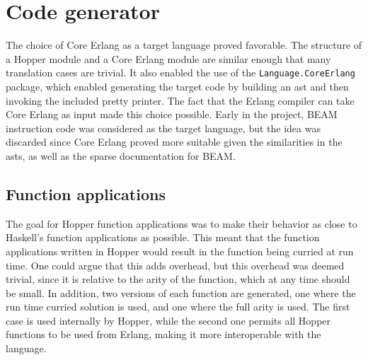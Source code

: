 \section{Code generator}

The choice of Core Erlang as a target language proved favorable. The structure of a Hopper module and a Core Erlang module are similar enough that many translation cases are trivial. It also enabled the use of the \texttt{Language.CoreErlang} \cite{CoreErlang} package, which enabled generating the target code by building an \gls{ast} and then invoking the included pretty printer. The fact that the Erlang compiler can take Core Erlang as input made this choice possible. Early in the project, BEAM instruction code was considered as the target language, but the idea was discarded since Core Erlang proved more suitable given the similarities in the \glspl{ast}, as well as the sparse documentation for BEAM.

\subsection{Function applications}

The goal for Hopper function applications was to make their behavior as close to Haskell's function applications as possible. This meant that the function applications written in Hopper would result in the function being curried at run time. One could argue that this adds overhead, but this overhead was deemed trivial, since it is relative to the \gls{arity} of the function, which at any time should be small. In addition, two versions of each function are generated, one where the run time curried solution is used, and one where the full arity is used. The first case is used internally by Hopper, while the second one permits all Hopper functions to be used from Erlang, making it more interoperable with the language.